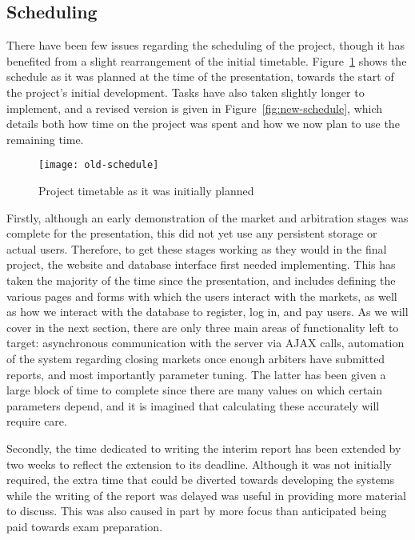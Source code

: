 \subsection{Scheduling}

There have been few issues regarding the scheduling of the project, though it
has benefited from a slight rearrangement of the initial timetable.
Figure~\ref{fig:old-schedule} shows the schedule as it was planned at the time
of the presentation, towards the start of the project's initial development.
Tasks have also taken slightly longer to implement, and a revised version is
given in Figure~\ref{fig:new-schedule}, which details both how time on the
project was spent and how we now plan to use the remaining time.

\begin{figure}[h]
	\centering
	\texttt{[image: old-schedule]}
	\caption{Project timetable as it was initially planned}
	\label{fig:old-schedule}
\end{figure}

Firstly, although an early demonstration of the market and arbitration stages
was complete for the presentation, this did not yet use any persistent storage
or actual users. Therefore, to get these stages working as they would in the
final project, the website and database interface first needed implementing.
This has taken the majority of the time since the presentation, and includes
defining the various pages and forms with which the users interact with the
markets, as well as how we interact with the database to register, log in, and
pay users. As we will cover in the next section, there are only three main
areas of functionality left to target: asynchronous communication with the
server via AJAX calls, automation of the system regarding closing markets once
enough arbiters have submitted reports, and most importantly parameter tuning.
The latter has been given a large block of time to complete since there are
many values on which certain parameters depend, and it is imagined that
calculating these accurately will require care.

Secondly, the time dedicated to writing the interim report has been extended by
two weeks to reflect the extension to its deadline. Although it was not
initially required, the extra time that could be diverted towards developing
the systems while the writing of the report was delayed was useful in providing
more material to discuss. This was also caused in part by more focus than
anticipated being paid towards exam preparation.

